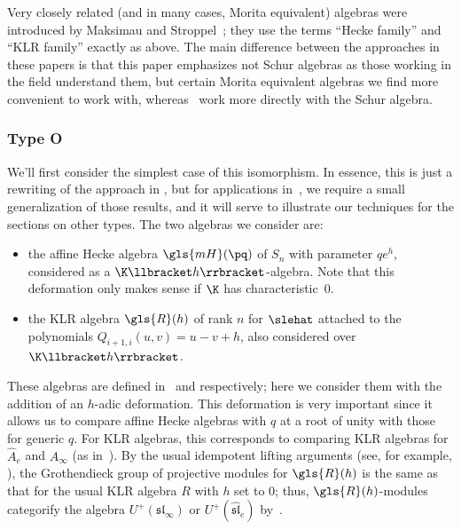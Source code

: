 \begin{rema}
 Very closely related (and in many cases, Morita equivalent) algebras
 were introduced by Maksimau and Stroppel~\cite{MS18}; they use the
 terms ``Hecke family'' and ``KLR family'' exactly as above. The
 main difference between the approaches in these papers is that this
 paper emphasizes not Schur algebras as those working in the field
 understand them, but certain Morita equivalent algebras we find more
 convenient to work with, whereas~\cite{MS18} work more directly
 with the Schur algebra. 
\end{rema}

\subsubsection*{Type O} We'll first consider the simplest case of
this isomorphism. In essence, this is just a rewriting of the
approach in 
\cite[\S~3.2]{Rou2KM}, but for applications in~\cite{WebRou}, we require
a small generalization of those results, and it will serve to
illustrate our techniques for the sections on other types. The two algebras we consider are:
\begin{itemize}
\item the affine Hecke algebra $\gls{mH}(\pq)$ of
$S_n$ with parameter $qe^h$, considered as a $\K\llbracket h\rrbracket$-algebra. Note
that this deformation only makes sense if $\K$ has characteristic~0.
\item the KLR algebra $\gls{R}(h)$ of rank $n$ for
$\slehat$ attached to the polynomials $Q_{i+1,i}(u,v)=u-v+h$, also
considered over $\K\llbracket h\rrbracket$.
\end{itemize}
These algebras are defined in~\cite[(4.1--5)]{BKKL} and
\cite[(1.6--15)]{BKKL} respectively; here we consider them with
the addition of an $h$-adic deformation. This deformation is very
important since it allows us to compare affine Hecke algebras with $q$
at a root of unity with those for generic $q$. 
For KLR algebras, this
corresponds to comparing KLR algebras for $\widehat{A}_e$ and
$A_\infty$ (as in~\cite[Ex.~2.25]{WebwKLR}).
By the usual idempotent lifting arguments (see, for example,
\cite[Lem.~2.2]{Kbook}), the Grothendieck group of
projective modules for $\gls{R}(h)$ is the same as that for the usual KLR
algebra $R$ with $h$ set to $0$; thus, $\gls{R}(h)$-modules categorify the
algebra $U^+(\mathfrak{sl}_\infty)$ or
$U^+(\mathfrak{\widehat{sl}}_e)$ by~\cite[Thm.~8]{KLII}.


